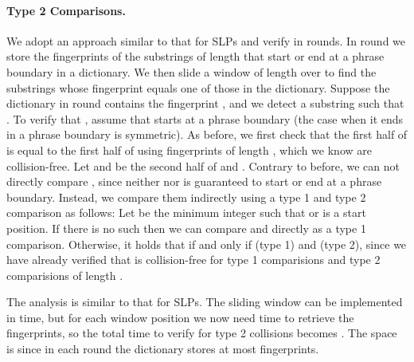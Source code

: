 \documentclass[11pt]{article}
\begin{document}
\paragraph{Type 2 Comparisons.}
We adopt an approach similar to that for SLPs and verify  in  rounds. In round  we store the fingerprints of the substrings of length  that start or end at a phrase boundary in a dictionary. We then slide a window of length  over  to find the substrings whose fingerprint equals one of those in the dictionary. Suppose the dictionary in round  contains the fingerprint , and we detect a substring  such that . To verify that , assume that  starts at a phrase boundary (the case when it ends in a phrase boundary is symmetric). As before, we first check that the first half of  is equal to the first half of  using fingerprints of length , which we know are collision-free. Let  and  be the second half of  and . Contrary to before, we can not directly compare , since neither  nor  is guaranteed to start or end at a phrase boundary. Instead, we compare them indirectly using a type 1 and type 2 comparison as follows: Let  be the minimum integer such that  or  is a start position. If there is no such  then we can compare  and  directly as a type 1 comparison. Otherwise, it holds that  if and only if  (type 1) and  (type 2), since we have already verified that  is collision-free for type 1 comparisions and type 2 comparisions of length .

The analysis is similar to that for SLPs. The sliding window can be implemented in  time, but for each window position we now need  time to retrieve the fingerprints, so the total time to verify  for type 2 collisions becomes . The space is  since in each round the dictionary stores at most  fingerprints.







\end{document}
